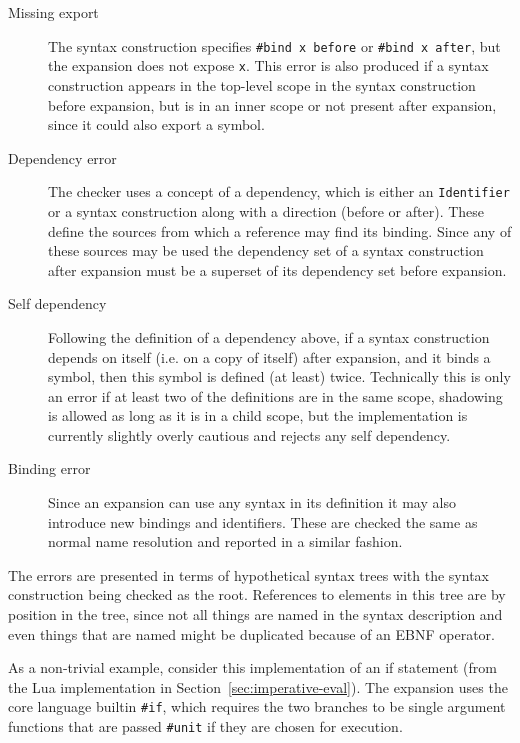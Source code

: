 \documentclass{kththesis}
\begin{document}
\begin{description}
  \item[Missing export] The syntax construction specifies \texttt{#bind x before} or \texttt{#bind x after}, but the expansion does not expose \texttt{x}. This error is also produced if a syntax construction appears in the top-level scope in the syntax construction before expansion, but is in an inner scope or not present after expansion, since it could also export a symbol.

  \item[Dependency error] The checker uses a concept of a dependency, which is either an \texttt{Identifier} or a syntax construction along with a direction (before or after). These define the sources from which a reference may find its binding. Since any of these sources may be used the dependency set of a syntax construction after expansion must be a superset of its dependency set before expansion.

  \item[Self dependency] Following the definition of a dependency above, if a syntax construction depends on itself (i.e. on a copy of itself) after expansion, and it binds a symbol, then this symbol is defined (at least) twice. Technically this is only an error if at least two of the definitions are in the same scope, shadowing is allowed as long as it is in a child scope, but the implementation is currently slightly overly cautious and rejects any self dependency.

  \item[Binding error] Since an expansion can use any syntax in its definition it may also introduce new bindings and identifiers. These are checked the same as normal name resolution and reported in a similar fashion.
\end{description}

The errors are presented in terms of hypothetical syntax trees with the syntax construction being checked as the root. References to elements in this tree are by position in the tree, since not all things are named in the syntax description and even things that are named might be duplicated because of an EBNF operator.

As a non-trivial example, consider this implementation of an if statement (from the Lua implementation in Section~\ref{sec:imperative-eval}). The expansion uses the core language builtin \texttt{#if}, which requires the two branches to be single argument functions that are passed \texttt{#unit} if they are chosen for execution.
\end{document}
